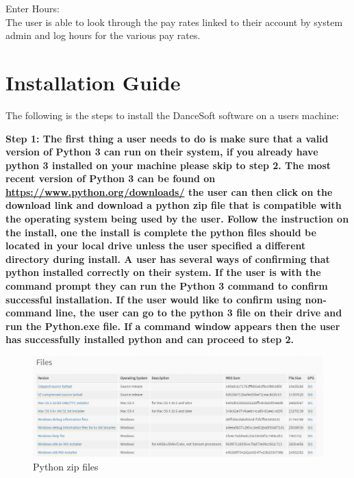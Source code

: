 Enter Hours:\\
The user is able to look through the pay rates linked to their account by system admin and log hours for the various pay rates.


\section{Installation Guide}
The following is the steps to install the DanceSoft software on a users machine:

\bf Step 1: \rm
	The first thing a user needs to do is make sure that a valid version of Python 3 can run on their system, if you already have python 3 installed on your machine please skip to step 2.
	The most recent version of Python 3 can be found on \url{https://www.python.org/downloads/} the user can then click on the download link and download a python zip file that is compatible with the operating system being used by the user.
	Follow the instruction on the install, one the install is complete the python files should be located in your local drive unless the user specified a different directory during install. A user has several ways of confirming that python installed correctly on their system. If the user is  with the command prompt they can run the Python 3 command to confirm successful installation. If the user would like to confirm using non-command line, the user can go to the python 3 file on their drive and run the Python.exe file. If a command window appears then the user has successfully installed python and can proceed to step 2.
	
\begin{figure}
  \includegraphics[width=\linewidth]{pics/pythonFiles.png}
  \caption{Python zip files}
  \label{fig:User doc: python files}
\end{figure}

